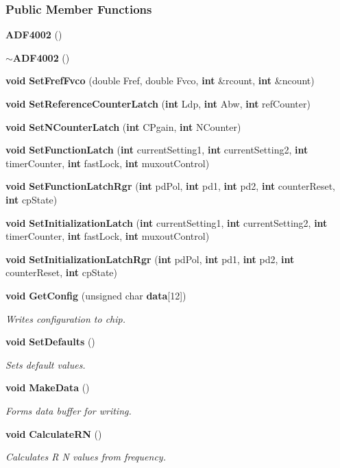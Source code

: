 \subsubsection*{Public Member Functions}
\begin{DoxyCompactItemize}
\item 
{\bf A\+D\+F4002} ()
\item 
{\bf $\sim$\+A\+D\+F4002} ()
\item 
{\bf void} {\bf Set\+Fref\+Fvco} (double Fref, double Fvco, {\bf int} \&rcount, {\bf int} \&ncount)
\item 
{\bf void} {\bf Set\+Reference\+Counter\+Latch} ({\bf int} Ldp, {\bf int} Abw, {\bf int} ref\+Counter)
\item 
{\bf void} {\bf Set\+N\+Counter\+Latch} ({\bf int} C\+Pgain, {\bf int} N\+Counter)
\item 
{\bf void} {\bf Set\+Function\+Latch} ({\bf int} current\+Setting1, {\bf int} current\+Setting2, {\bf int} timer\+Counter, {\bf int} fast\+Lock, {\bf int} muxout\+Control)
\item 
{\bf void} {\bf Set\+Function\+Latch\+Rgr} ({\bf int} pd\+Pol, {\bf int} pd1, {\bf int} pd2, {\bf int} counter\+Reset, {\bf int} cp\+State)
\item 
{\bf void} {\bf Set\+Initialization\+Latch} ({\bf int} current\+Setting1, {\bf int} current\+Setting2, {\bf int} timer\+Counter, {\bf int} fast\+Lock, {\bf int} muxout\+Control)
\item 
{\bf void} {\bf Set\+Initialization\+Latch\+Rgr} ({\bf int} pd\+Pol, {\bf int} pd1, {\bf int} pd2, {\bf int} counter\+Reset, {\bf int} cp\+State)
\item 
{\bf void} {\bf Get\+Config} (unsigned char {\bf data}[12])
\begin{DoxyCompactList}\small\item\em Writes configuration to chip. \end{DoxyCompactList}\item 
{\bf void} {\bf Set\+Defaults} ()
\begin{DoxyCompactList}\small\item\em Sets default values. \end{DoxyCompactList}\item 
{\bf void} {\bf Make\+Data} ()
\begin{DoxyCompactList}\small\item\em Forms data buffer for writing. \end{DoxyCompactList}\item 
{\bf void} {\bf Calculate\+RN} ()
\begin{DoxyCompactList}\small\item\em Calculates R N values from frequency. \end{DoxyCompactList}\end{DoxyCompactItemize}

